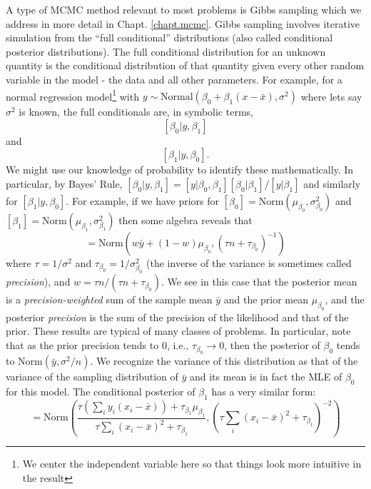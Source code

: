 A type of MCMC method relevant to most problems is Gibbs sampling 
\citep{geman_geman:1984} which we address in more detail in Chapt. \ref{chapt.mcmc}.
Gibbs sampling 
involves 
iterative simulation from the ``full
conditional'' 
distributions (also called conditional posterior
distributions). The full conditional distribution for an unknown
quantity is the conditional distribution of that quantity given every
other random variable in the model - the data and all other
parameters. 
For example, for a normal regression model\footnote{We center the 
independent variable here so that things look more intuitive in the result} with $y \sim
\mbox{Normal}(\beta_0 + \beta_1 (x-\bar{x}) , \sigma^{2})$
where lets say $\sigma^{2}$ is known, the full conditionals are, in symbolic terms,
\[
[\beta_0|y,\beta_1]
\]
 and
\[
[\beta_1|y,\beta_0].
\]
We might use our knowledge of probability to identify these
mathematically. In particular, by Bayes' Rule, $[\beta_0|y,\beta_1] =
[y|\beta_0,\beta_1][\beta_0|\beta_1]/[y|\beta_1]$ and similarly for
$[\beta_1|y,\beta_0]$. For example, if we have priors for 
$[\beta_0] = \mbox{Norm}(\mu_{\beta_0}, \sigma^{2}_{\beta_0})$ 
and 
$[\beta_1] = \mbox{Norm}(\mu_{\beta_1}, \sigma^{2}_{\beta_1})$ then
some algebra reveals that 
\begin{equation}
[\beta_0|y,\beta_1] = \mbox{Norm}\left(w \bar{y} + (1-w)\mu_{\beta_0},
(\tau n + \tau_{\beta_0})^{-1} \right)
\label{glms.eq.alpha}
\end{equation}
where $\tau = 1/\sigma^{2}$ and $\tau_{\beta_0} = 1/\sigma^{2}_{\beta_0}$
(the inverse of the variance is sometimes called {\it precision}), and
$w = \tau n/(\tau n + \tau_{\beta_0})$. We see in this case that the
posterior mean is a {\it precision-weighted} sum of the sample mean
$\bar{y}$ and the prior mean $\mu_{\beta_0}$, and the posterior {\it precision} 
is the sum of the precision of the likelihood and that of the
prior. These results are typical of many
classes of problems. In particular, note that as the prior precision
tends to 0, i.e., $\tau_{\beta_0} \rightarrow 0$, then the posterior of
$\beta_0$ tends to  $\mbox{Norm}(\bar{y}, \sigma^{2}/n)$. We recognize the 
variance of this distribution as that of the variance of the sampling
distribution of $\bar{y}$ and its mean is in fact the MLE of $\beta_0$
for this model. 
The conditional posterior of $\beta_1$ has a very similar form:
\begin{equation}
 [\beta_1|y,\beta_0]  = \mbox{Norm}\left(
\frac{ \tau (\sum_{i} y_{i}(x_{i}-\bar{x}) ) + \tau_{\beta_1} \mu_{\beta_1}}
{ \tau \sum_{i} (x_{i}-\bar{x})^{2} + \tau_{\beta_1}},
(\tau \sum_{i} (x_{i}-\bar{x})^{2} + \tau_{\beta_1} )^{-2} \right)
\label{glms.eq.beta}
\end{equation}
